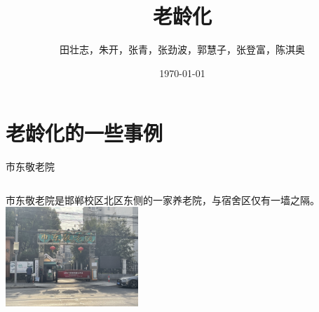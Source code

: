 \documentclass[presentation]{beamer}
\author{田壮志，朱开，张青，张劲波，郭慧子，张登富，陈淇奥}
\date{\today}
\title{老龄化}
\begin{document}
\maketitle

\section{老龄化的一些事例}
\label{sec:orgb6e9242}
\begin{frame}[label={sec:orgd52673a}]{市东敬老院}
\begin{columns}[onlytextwidth,T]
  \column{\dimexpr\linewidth-50mm-5mm}
市东敬老院是邯郸校区北区东侧的一家养老院，与宿舍区仅有一墙之隔。
  \column{50mm}
\includegraphics[width=50mm]{3}
\end{columns}
\end{frame}
\end{document}
